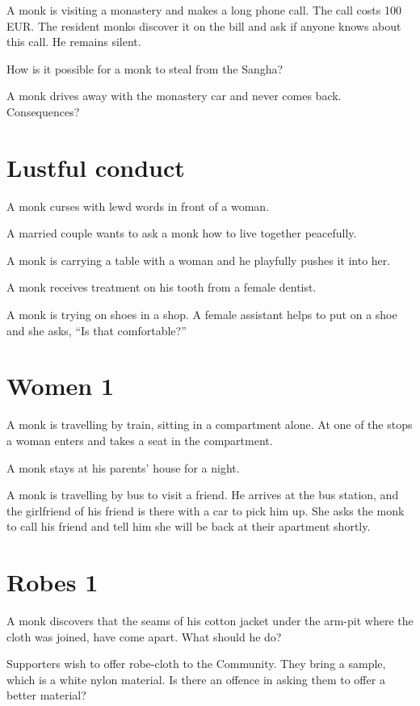 A monk is visiting a monastery and makes a long phone call. The call
costs 100 EUR. The resident monks discover it on the bill and ask if
anyone knows about this call. He remains silent.

How is it possible for a monk to steal from the Sangha?

A monk drives away with the monastery car and never comes back.
Consequences?

\section{Lustful conduct}

A monk curses with lewd words in front of a woman.

A married couple wants to ask a monk how to live together peacefully.

A monk is carrying a table with a woman and he playfully pushes it into
her.

A monk receives treatment on his tooth from a female dentist.

A monk is trying on shoes in a shop. A female assistant helps to put on
a shoe and she asks, ``Is that comfortable?''

\section{Women 1}

\enlargethispage{3\baselineskip}

A monk is travelling by train, sitting in a compartment alone. At one of
the stops a woman enters and takes a seat in the compartment.

A monk stays at his parents' house for a night.

A monk is travelling by bus to visit a friend. He arrives at the bus
station, and the girlfriend of his friend is there with a car to pick
him up. She asks the monk to call his friend and tell him she will be
back at their apartment shortly.

\section{Robes 1}

A monk discovers that the seams of his cotton jacket under the arm-pit
where the cloth was joined, have come apart. What should he do?

Supporters wish to offer robe-cloth to the Community. They bring a
sample, which is a white nylon material. Is there an offence in asking
them to offer a better material?

